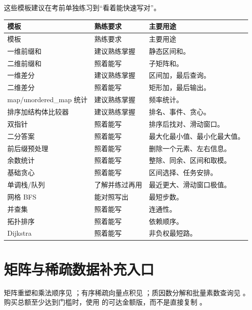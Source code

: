 这些模板建议在考前单独练习到“看着能快速写对”。

\begin{longtable}{p{4cm}p{4cm}p{6cm}}
\toprule
模板 & 熟练要求 & 主要用途 \\
\midrule
\endfirsthead
\toprule
模板 & 熟练要求 & 主要用途 \\
\midrule
\endhead
一维前缀和 & 建议熟练掌握 & 静态区间和。 \\
二维前缀和 & 照着能写 & 子矩阵和。 \\
一维差分 & 建议熟练掌握 & 区间加，最后查询。 \\
二维差分 & 照着能写 & 矩形加，最后输出。 \\
map/unordered\_map 统计 & 建议熟练掌握 & 频率统计。 \\
排序加结构体比较器 & 建议熟练掌握 & 排名、事件、贪心。 \\
双指针 & 照着能写 & 排序后找对、滑动窗口。 \\
二分答案 & 照着能写 & 最大化最小值、最小化最大值。 \\
前后缀预处理 & 照着能写 & 删除一个元素、左右信息。 \\
余数统计 & 照着能写 & 整除、同余、区间和取模。 \\
基础贪心 & 照着能写 & 区间选择、任务安排。 \\
单调栈/队列 & 了解并练过再用 & 最近更大、滑动窗口极值。 \\
网格 BFS & 能对照写出 & 最短步数。 \\
并查集 & 照着能写 & 连通性。 \\
拓扑排序 & 照着能写 & 依赖顺序。 \\
Dijkstra & 照着能写 & 非负权最短路。 \\
\bottomrule
\end{longtable}

\section{矩阵与稀疏数据补充入口}\label{sec:06-33}
矩阵重塑和乘法顺序见 ；有序稀疏向量点积见 ；质因数分解和批量素数查询见 。购买总额至少达到门槛时，使用  的可达金额版，而不是直接复制 。
